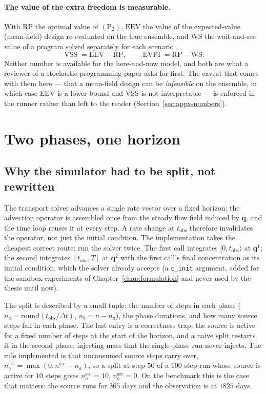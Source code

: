 \documentclass[11pt]{article}
\newcommand{\qq}{\mathbf{q}}
\begin{document}
\paragraph{The value of the extra freedom is measurable.} With $\mathrm{RP}$ the
optimal value of $(\mathrm{P}_2)$, $\mathrm{EEV}$ the value of the
expected-value (mean-field) design re-evaluated on the true ensemble, and
$\mathrm{WS}$ the wait-and-see value of a program solved separately for each
scenario \citep{birge2011},
\begin{equation}
\operatorname{VSS}=\mathrm{EEV}-\mathrm{RP},
\qquad
\operatorname{EVPI}=\mathrm{RP}-\mathrm{WS}.
\label{eq:appx-vss}
\end{equation}
Neither number is available for the here-and-now model, and both are what a
reviewer of a stochastic-programming paper asks for first. The caveat that comes
with them here --- that a mean-field design can be \emph{infeasible} on the
ensemble, in which case $\mathrm{EEV}$ is a lower bound and VSS is not
interpretable --- is enforced in the runner rather than left to the reader
(Section~\ref{sec:appx-numbers}).

\section{Two phases, one horizon}
\label{sec:appx-disc}

\subsection{Why the simulator had to be split, not rewritten}

The transport solver advances a single rate vector over a fixed horizon: the
advection operator is assembled once from the steady flow field induced by
$\qq$, and the time loop reuses it at every step. A rate change at
$t_{\mathrm{obs}}$ therefore invalidates the operator, not just the initial
condition. The implementation takes the cheapest correct route: run the solver
twice. The first call integrates $[0,t_{\mathrm{obs}})$ at $\qq^{1}$; the second
integrates $[t_{\mathrm{obs}},T]$ at $\qq^{2}$ with the first call's final
concentration as its initial condition, which the solver already accepts (a
\texttt{c\_init} argument, added for the sandbox experiments of
Chapter~\ref{chap:formulation} and never used by the thesis until now).

The split is described by a small tuple: the number of steps in each phase
($n_a=\mathrm{round}(t_{\mathrm{obs}}/\Delta t)$, $n_b=n-n_a$), the phase
durations, and how many source steps fall in each phase. The last entry is a
correctness trap: the source is active for a fixed number of steps at the start
of the horizon, and a naive split restarts it in the second phase, injecting mass
that the single-phase run never injects. The rule implemented is that
unconsumed source steps carry over,
$n^{\mathrm{src}}_b=\max(0,n^{\mathrm{src}}-n_a)$, so a split at step $50$ of a
$100$-step run whose source is active for $10$ steps gives
$n^{\mathrm{src}}_a=10$, $n^{\mathrm{src}}_b=0$. On the benchmark this is the
case that matters: the source runs for $365$ days and the observation is at
$1825$ days.
\end{document}

